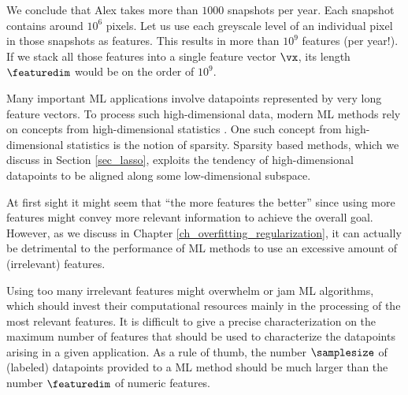 \documentclass[12pt]{report}
\newcommand{\featurelen}{\featuredim}
\begin{document}
We conclude that Alex takes more than $1000$ snapshots per year. 
Each snapshot contains around $10^{6}$ pixels. Let us use each  
greyscale level of an individual pixel in those snapshots as features. 
This results in more than $10^{9}$ features (per year!). If we stack all 
those features into a single feature vector $\vx$, its length $\featurelen$ 
would be on the order of $10^{9}$. 

Many important ML applications involve datapoints represented by very 
long feature vectors. To process such high-dimensional data, modern 
ML methods rely on concepts from high-dimensional statistics \cite{BuhlGeerBook,Wain2019}. 
One such concept from high-dimensional statistics is the notion 
of sparsity. Sparsity based methods, which we discuss in Section \ref{sec_lasso}, 
exploits the tendency of high-dimensional datapoints to be aligned along 
some low-dimensional subspace.  



At first sight it might seem that ``the more features the better'' 
since using more features might convey more relevant information 
to achieve the overall goal. However, as we discuss in Chapter \ref{ch_overfitting_regularization}, 
it can actually be detrimental to the performance of ML methods 
to use an excessive amount of (irrelevant) features. 

Using too many irrelevant features might overwhelm or jam ML 
algorithms, which should invest their computational resources 
mainly in the processing of the most relevant features. It is difficult 
to give a precise characterization on the maximum number of 
features that should be used to characterize the datapoints 
arising in a given application. As a rule of thumb, the number $\samplesize$ 
of (labeled) datapoints provided to a ML method should be 
much larger than the number $\featurelen$ of numeric features.
\end{document}
